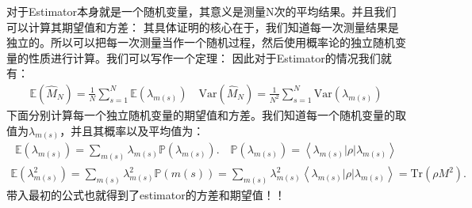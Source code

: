 对于Estimator本身就是一个随机变量，其意义是测量N次的平均结果。并且我们可以计算其期望值和方差：
其具体证明的核心在于，我们知道每一次测量结果是独立的。所以可以把每一次测量当作一个随机过程，然后使用概率论的独立随机变量的性质进行计算。我们可以写作一个定理：
因此对于Estimator的情况我们就有：
\begin{align}
  \mathbb{E}\left(\hat{M}_N\right)=\frac{1}{N}\sum_{s=1}^N\mathbb{E}\left(\lambda_{m(s)}\right)
  \quad
  \mathrm{Var}\left(\hat{M}_N\right)=\frac{1}{N^2}\sum_{s=1}^N\mathrm{Var}\left(\lambda_{m(s)}\right)
\end{align}
下面分别计算每一个独立随机变量的期望值和方差。我们知道每一个随机变量的取值为$ \lambda_{m(s)} $，并且其概率以及平均值为：
\begin{align}
  \mathbb{E}\left(\lambda_{m(s)}\right)=\sum_{m(s)}\lambda_{m(s)}\mathbb{P}\left(\lambda_{m(s)}\right).\quad
  \mathbb{P}(\lambda_{m(s)})=\left\langle\lambda_{m(s)}|\rho|\lambda_{m(s)}\right\rangle
\end{align}
\begin{align}
  \mathbb{E}{\left(\lambda_{m(s)}^2\right)}=\sum_{m(s)}\lambda_{m(s)}^2\mathbb{P}{\left(m(s)\right)}=\sum_{m(s)}\lambda_{m(s)}^2{\left\langle\lambda_{m(s)}{\left|\rho\right|}\lambda_{m(s)}\right\rangle}=\mathrm{Tr}{\left(\rho
  M^2\right)}.
\end{align}
带入最初的公式也就得到了estimator的方差和期望值！！

